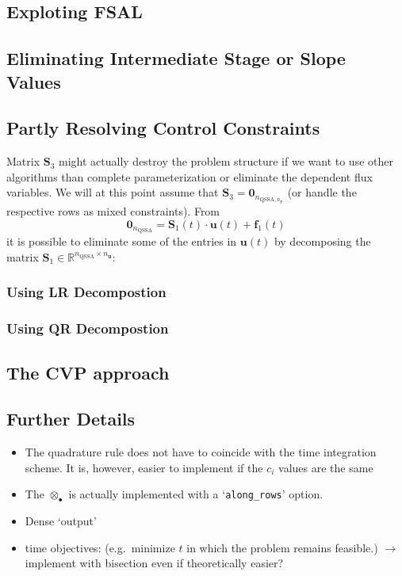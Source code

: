 \documentclass{article}
\newcommand{\kron}{\otimes}%
\newcommand{\dkron}[2][]{\mathbin{\kron_{#2}^{#1}}}%
\newcommand{\setR}{\mathbb{R}}%
\newcommand{\vectorfont}[1]{\boldsymbol{#1}}%
\newcommand{\greekvectorfont}[1]{\boldsymbol{#1}}%
\newcommand{\matrixfont}[1]{\mathbf{#1}}%
\newcommand{\fvec}{\vectorfont{f}}
\newcommand{\uvec}{\vectorfont{u}}
\newcommand{\yvec}{\vectorfont{y}}
\newcommand{\nullvec}{\greekvectorfont{0}}
\newcommand{\Smat}{\matrixfont{S}}
\newcommand{\Nullmat}{\matrixfont{0}}
\begin{document}
\subsection*{Exploting FSAL}

\subsection*{Eliminating Intermediate Stage or Slope Values}

\subsection*{Partly Resolving Control Constraints}
Matrix $\Smat_3$ might actually destroy the problem structure if we want to use other algorithms than complete parameterization or eliminate the dependent flux variables.%
We will at this point assume that $\Smat_3 = \Nullmat_{n_{\mathrm{QSSA}, n_{\yvec}}}$ (or handle the respective rows as mixed constraints).
From
\[
\nullvec_{n_{\mathrm{QSSA}}} = \Smat_1(t) \cdot \uvec(t) + \fvec_1(t)
\]
it is possible to eliminate some of the entries in $\uvec(t)$ by decomposing the matrix $\Smat_1 \in \setR^{n_{\mathrm{QSSA}} \times n_{\uvec}}$:

\subsubsection*{Using LR Decompostion}

\subsubsection*{Using QR Decompostion}


\subsection*{The CVP approach}

\subsection*{Further Details}

\begin{itemize}
	\item The quadrature rule does not have to coincide with the time integration scheme. It is, however, easier to implement if the $c_i$ values are the same
	\item The $\dkron{\bullet}$ is actually implemented with a \lq\texttt{along\_rows}\rq{} option.
	\item Dense \lq output\rq
	\item time objectives: (e.g.\ minimize $t$ in which the problem remains feasible.) $\to$ implement with bisection even if theoretically easier?
\end{itemize}
\end{document}
